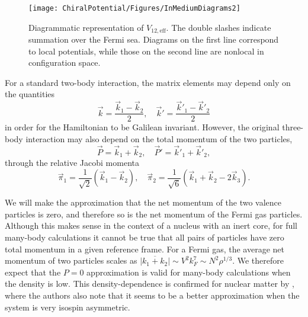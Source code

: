 \begin{figure}\centering
\texttt{[image: ChiralPotential/Figures/InMediumDiagrams2]}
\caption[Diagrammatic representation of $V_{12,\text{eff}}$]{\label{fig:eff-diagram} Diagrammatic representation of $V_{12,\text{eff}}$. The double slashes indicate summation over the Fermi sea. Diagrams on the first line correspond to local potentials, while those on the second line are nonlocal in configuration space.}
\end{figure}

For a standard two-body interaction, the matrix elements may depend only on the quantities
 \begin{equation}
 \vec{k}=\frac{\vec{k}_1-\vec{k}_2}{2},\quad \vec{k}'=\frac{\vec{k}'_1-\vec{k}'_2}{2}
 \end{equation}
 in order for the Hamiltonian to be Galilean invariant. However, the original three-body interaction may also depend on the total momentum of the two particles,
 \begin{equation}
 \vec{P}=\vec{k}_1+\vec{k}_2, \quad  \vec{P}'=\vec{k}'_1+\vec{k}'_2,
 \end{equation}
 through the relative Jacobi momenta 
 \begin{equation}
 \vec{\pi}_1=\frac{1}{\sqrt{2}}\left(\vec{k}_1-\vec{k}_2\right), \quad  \vec{\pi}_2=\frac{1}{\sqrt{6}}\left(\vec{k}_1+\vec{k}_2-2\vec{k}_3\right).
 \end{equation}
 
We will make the approximation that the net momentum of the two valence particles is zero, and therefore so is the net momentum of the Fermi gas particles. Although this makes sense in the context of a nucleus with an inert core, for full many-body calculations it cannot be true that all pairs of particles have zero total momentum in a given reference frame. For a Fermi gas, the average net momentum of two particles scales as 
$\overline{|k_1+k_2|} \sim V^2 k_F^7 
\sim N^2 \rho^{1/3}$. 
We therefore expect that the $P=0$ approximation is valid for many-body calculations when the density is low. This density-dependence is confirmed for nuclear matter by \cite{Drischler:2015eba}, where the authors also note that it seems to be a better approximation when the system is very isospin asymmetric. 
 
